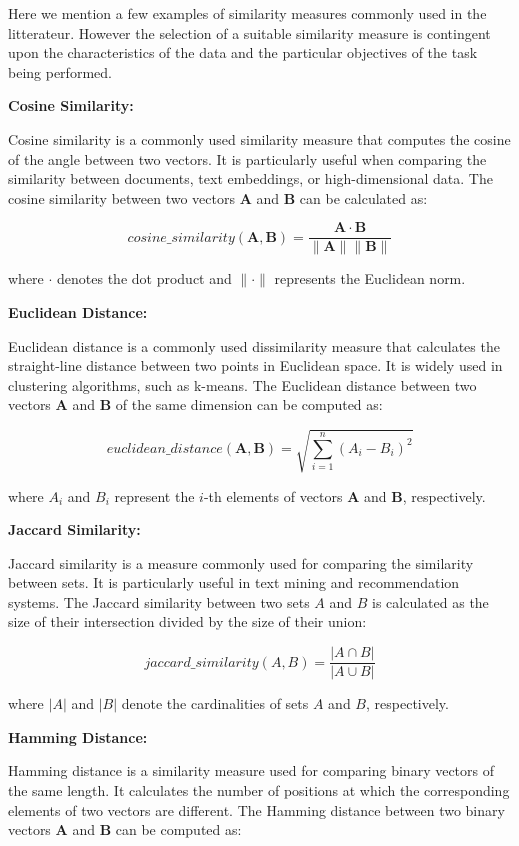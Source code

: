 \documentclass[a4paper,12pt]{article}
\begin{document}
Here we mention a few examples of similarity measures commonly used in the litterateur. However the selection of a suitable similarity measure is contingent upon the characteristics of the data and the particular objectives of the task being performed.

\textbf{Cosine Similarity:}

Cosine similarity is a commonly used similarity measure that computes the cosine of the angle between two vectors. It is particularly useful when comparing the similarity between documents, text embeddings, or high-dimensional data. The cosine similarity between two vectors $\mathbf{A}$ and $\mathbf{B}$ can be calculated as:

$$cosine\_similarity(\mathbf{A}, \mathbf{B}) = \frac{\mathbf{A} \cdot \mathbf{B}}{\|\mathbf{A}\| \|\mathbf{B}\|}$$

where $\cdot$ denotes the dot product and $\|\cdot\|$ represents the Euclidean norm.

\textbf{Euclidean Distance:}

Euclidean distance is a commonly used dissimilarity measure that calculates the straight-line distance between two points in Euclidean space. It is widely used in clustering algorithms, such as k-means. The Euclidean distance between two vectors $\mathbf{A}$ and $\mathbf{B}$ of the same dimension can be computed as:

$$
euclidean\_distance(\mathbf{A}, \mathbf{B}) = \sqrt{\sum_{i=1}^{n} (A_i - B_i)^2}
$$

where $A_i$ and $B_i$ represent the $i$-th elements of vectors $\mathbf{A}$ and $\mathbf{B}$, respectively.

\textbf{Jaccard Similarity:}

Jaccard similarity \cite{jaccard} is a measure commonly used for comparing the similarity between sets. It is particularly useful in text mining and recommendation systems. The Jaccard similarity between two sets $A$ and $B$ is calculated as the size of their intersection divided by the size of their union:

$$
jaccard\_similarity(A, B) = \frac{|A \cap B|}{|A \cup B|}
$$

where $|A|$ and $|B|$ denote the cardinalities of sets $A$ and $B$, respectively.

\textbf{Hamming Distance:}

Hamming distance \cite{hamming} is a similarity measure used for comparing binary vectors of the same length. It calculates the number of positions at which the corresponding elements of two vectors are different. The Hamming distance between two binary vectors $\mathbf{A}$ and $\mathbf{B}$ can be computed as:
\end{document}
